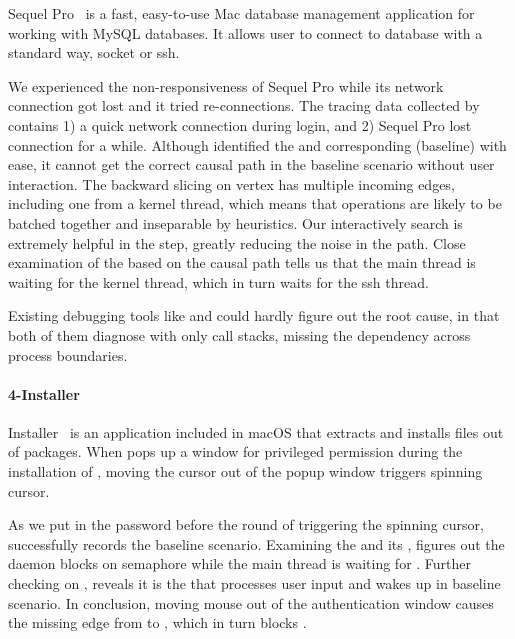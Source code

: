 Sequel Pro~\cite{SequelPro} is a fast, easy-to-use Mac database management
application for working with MySQL databases. It allows user to connect to
database with a standard way, socket or ssh.

We experienced the non-responsiveness of Sequel Pro while its network connection
got lost and it tried re-connections. The tracing data collected by \xxx
contains 1) a quick network connection during login, and 2) Sequel Pro lost
connection for a while. Although \xxx identified the \spinningnode and
corresponding (baseline) \similarnode with ease, it cannot get the correct
causal path in the baseline scenario without user interaction. The backward
slicing on vertex has multiple incoming edges, including one from a kernel
thread, which means that operations are likely to be batched together and
inseparable by heuristics. Our interactively search is extremely helpful in
the step, greatly reducing the noise in the path. Close examination of the
\spinningnode based on the causal path tells us that the main thread is waiting
for the kernel thread, which in turn waits for the ssh thread.

Existing debugging tools like  and  could hardly figure
out the root cause, in that both of them diagnose with only call stacks, missing
the dependency across process boundaries.

\paragraph{4-Installer}

Installer~\cite{Installer} is an application included in macOS that extracts and
installs files out of  packages. When  pops up a window
for privileged permission during the installation of ,
moving the cursor out of the popup window triggers spinning cursor.

As we put in the password before the round of triggering the spinning cursor,
\xxx successfully records the baseline scenario. Examining the \spinningnode and
its \similarnode, \xxx figures out the daemon  blocks on semaphore
while the main thread is waiting for . Further checking on ,
\xxx reveals it is the  that processes user input and wakes
up  in baseline scenario. In conclusion, moving mouse out of the
authentication window causes the missing edge from  to
, which in turn blocks .


